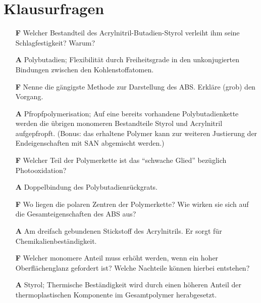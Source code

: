 \chapter{Klausurfragen}
    \begin{itemize}
        \item[\textbf{F}] Welcher Bestandteil des Acrylnitril-Butadien-Styrol verleiht ihm seine Schlagfestigkeit? Warum?
        \item[\textbf{A}] Polybutadien; Flexibilität durch Freiheitsgrade in den unkonjugierten Bindungen zwischen den Kohlenstoffatomen.
        \vspace{4mm}
        \item[\textbf{F}] Nenne die gängigste Methode zur Darstellung des ABS. Erkläre (grob) den Vorgang.
        \item[\textbf{A}] Pfropfpolymerisation; Auf eine bereits vorhandene Polybutadienkette werden die übrigen monomeren Bestandteile
                            Styrol und Acrylnitril aufgepfropft. (Bonus: das erhaltene Polymer kann zur weiteren Justierung der Endeigenschaften
                            mit SAN abgemischt werden.) 
        \vspace{4mm}
        \item[\textbf{F}] Welcher Teil der Polymerkette ist das \enquote{schwache Glied} bezüglich Photooxidation?
        \item[\textbf{A}] Doppelbindung des Polybutadienrückgrats.
        \vspace{4mm}
        \item[\textbf{F}] Wo liegen die polaren Zentren der Polymerkette? Wie wirken sie sich auf die Gesamteigenschaften des ABS aus?
        \item[\textbf{A}] Am dreifach gebundenen Stickstoff des Acrylnitrils. Er sorgt für Chemikalienbeständigkeit.
        \vspace{4mm}
        \item[\textbf{F}] Welcher monomere Anteil muss erhöht werden, wenn ein hoher Oberflächenglanz gefordert ist? Welche Nachteile können hierbei entstehen?
        \item[\textbf{A}] Styrol; Thermische Beständigkeit wird durch einen höheren Anteil der thermoplastischen Komponente im Gesamtpolymer herabgesetzt.
    \end{itemize}